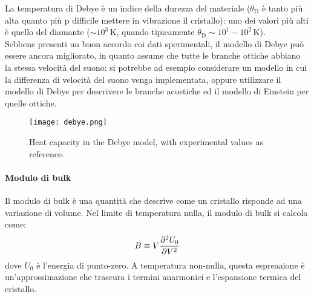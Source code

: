 La temperatura di Debye è un indice della durezza del materiale ($ \theta_\text{D} $ è tanto più alta quanto più p difficile mettere in vibrazione il cristallo): uno dei valori più alti è quello del diamante ($ \sim 10^3 \,\text{K} $, quando tipicamente $ \theta_\text{D} \sim 10^1 - 10^2 \,\text{K} $). \\
Sebbene presenti un buon accordo coi dati sperimentali, il modello di Debye può essere ancora migliorato, in quanto assume che tutte le branche ottiche abbiano la stessa velocità del suono: si potrebbe ad esempio considerare un modello in cui la differenza di velocità del suono venga implementata, oppure utilizzare il modello di Debye per descrivere le branche acustiche ed il modello di Einstein per quelle ottiche.


\begin{figure}
	\centering
	\texttt{[image: debye.png]}
	\caption{Heat capacity in the Debye model, with experimental values as reference.}
	\label{deb}
\end{figure}

\paragraph{Modulo di bulk}

Il modulo di bulk è una quantità che descrive come un cristallo risponde ad una variazione di volume. Nel limite di temperatura nulla, il modulo di bulk si calcola come:
\begin{equation}
	B \equiv V \frac{\partial^2 U_0}{\partial V^2}
\end{equation}
dove $ U_0 $ è l'energia di punto-zero. A temperatura non-nulla, questa espreaaione è un'approssimazione che trascura i termini anarmonici e l'espansione termica del cristallo.

